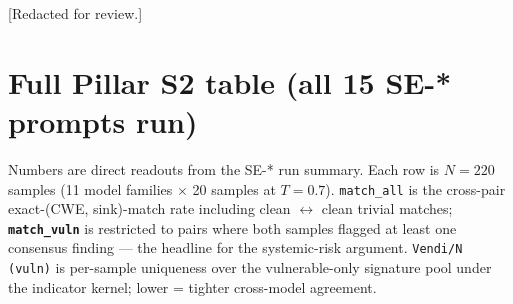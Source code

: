\documentclass{article}
\begin{document}
[Redacted for review.]




\appendix

\section{Full Pillar S2 table (all 15 SE-* prompts run)}
\label{app:s2}

Numbers are direct readouts from the SE-* run summary. Each row is $N=220$
samples (11 model families $\times$ 20 samples at $T=0.7$). \texttt{match\_all}
is the cross-pair exact-(CWE, sink)-match rate including clean
$\leftrightarrow$ clean trivial matches; \textbf{\texttt{match\_vuln}} is
restricted to pairs where both samples flagged at least one consensus
finding --- the headline for the systemic-risk argument. \texttt{Vendi/N
(vuln)} is per-sample uniqueness over the vulnerable-only signature pool
under the indicator kernel; lower = tighter cross-model agreement.
\end{document}
